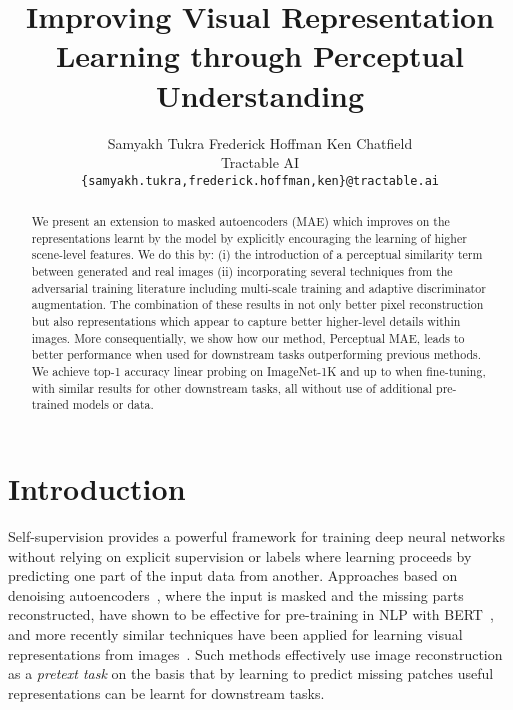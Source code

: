 \documentclass[10pt,twocolumn,letterpaper, cta-author]{article}
\begin{document}
\title{Improving Visual Representation Learning through Perceptual Understanding}





\author{
Samyakh Tukra \hspace{0.4cm} Frederick Hoffman \hspace{0.4cm} Ken Chatfield\\
Tractable AI\\
{\tt\small \{samyakh.tukra,frederick.hoffman,ken\}@tractable.ai}
}

\maketitle

\begin{abstract}
   We present an extension to masked autoencoders (MAE) which improves on the representations learnt by the model by explicitly encouraging the learning of higher scene-level features. We do this by: (i) the introduction of a perceptual similarity term between generated and real images (ii) incorporating several techniques from the adversarial training literature including multi-scale training and adaptive discriminator augmentation. The combination of these results in not only better pixel reconstruction but also representations which appear to capture better higher-level details within images. More consequentially, we show how our method, Perceptual MAE, leads to better performance when used for downstream tasks outperforming previous methods. We achieve  top-1 accuracy linear probing on ImageNet-1K and up to  when fine-tuning, with similar results for other downstream tasks, all without use of additional pre-trained models or data.
\end{abstract}

\section{Introduction}
\label{sec:intro}
Self-supervision provides a powerful framework for training deep neural networks without relying on explicit supervision or labels where learning proceeds by predicting one part of the input data from another. Approaches based on denoising autoencoders~\cite{Vincent2008}, where the input is masked and the missing parts reconstructed, have shown to be effective for pre-training in NLP with BERT~\cite{47751}, and more recently similar techniques have been applied for learning visual representations from images~\cite{pmlr-v119-chen20s, 50650, MaskedAutoencoders2021, bao2022beit}. Such methods effectively use image reconstruction as a \textit{pretext task} on the basis that by learning to predict missing patches useful representations can be learnt for downstream tasks.
\end{document}
